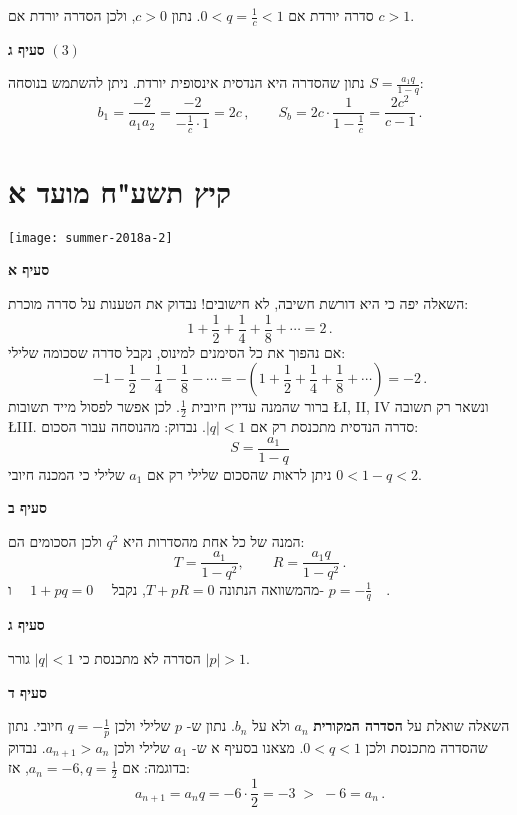 סדרה יורדת אם
$0<q=\displaystyle\frac{1}{c} < 1$.
נתון
$c>0$,
ולכן הסדרה יורדת אם
$c>1$.

\textbf{סעיף ג}
$(3)$

נתון שהסדרה היא הנדסית אינסופית יורדת. ניתן להשתמש בנוסחה 
$S=\displaystyle\frac{a_1q}{1-q}$:
\[
b_1=\frac{-2}{a_1a_2}= \frac{-2}{\displaystyle-\frac{1}{c}\cdot 1}=2c\,,\quad\quad
S_b = 2c\cdot\frac{1}{1-\displaystyle\frac{1}{c}}=\frac{2c^2}{c-1}\,.
\]


\np
\section{קיץ תשע"ח מועד א}

\begin{center}
\texttt{[image: summer-2018a-2]}
\end{center}

\textbf{סעיף א}

השאלה יפה כי היא דורשת חשיבה, לא חישובים! נבדוק את הטענות על סדרה מוכרת:
\[
1+ \frac{1}{2} + \frac{1}{4} + \frac{1}{8} + \cdots = 2\,.
\]
אם נהפוך את כל הסימנים למינוס, נקבל סדרה שסכומה שלילי:
\[
-1 - \frac{1}{2} - \frac{1}{4} - \frac{1}{8} - \cdots = -\left(1+ \frac{1}{2} + \frac{1}{4} + \frac{1}{8} + \cdots\right) = -2\,.
\]
ברור שהמנה עדיין חיובית
$\frac{1}{2}$.
לכן אפשר לפסול מייד תשובות 
\L{I, II, IV}
ונשאר רק תשובה
\L{III}.
סדרה הנדסית מתכנסת רק אם
$|q|<1$.
נבדוק: מהנוסחה עבור הסכום:
\[
S = \frac{a_1}{1-q}
\]
ניתן לראות שהסכום שלילי רק אם 
$a_1$
שלילי כי המכנה חיובי
$0 < 1-q < 2$.

\textbf{סעיף ב}

המנה של כל אחת מהסדרות היא
$q^2$
ולכן הסכומים הם:
\[
T = \frac{a_1}{1-q^2},\quad\quad R = \frac{a_1q}{1-q^2}\,.
\]
מהמשוואה הנתונה
$T+pR=0$,
נקבל
$\quad 1+pq=0\quad$
ו-%
$p=-\displaystyle\frac{1}{q}\quad$.

\textbf{סעיף ג}

הסדרה לא מתכנסת כי 
$|q|<1$
גורר
$|p|>1$.

\textbf{סעיף ד}

השאלה שואלת על
\textbf{הסדרה המקורית}
$a_n$
ולא על 
$b_n$.
נתון ש-%
$p$
שלילי ולכן
$q=-\displaystyle\frac{1}{p}$
חיובי. נתון שהסדרה מתכנסת ולכן
$0<q<1$.
מצאנו בסעיף א ש-%
$a_1$
שלילי ולכן
$a_{n+1}>a_n$.
נבדוק בדוגמה: אם 
$a_n=-6,q=\frac{1}{2}$,
אז:
\[
a_{n+1} = a_nq = -6\cdot \frac{1}{2} = -3 \;> \; -6 =a_n\,.
\]



